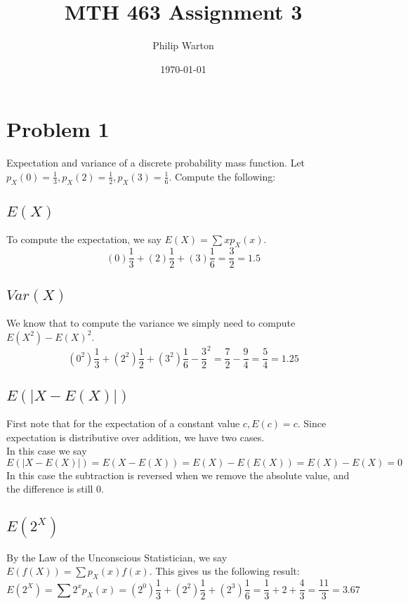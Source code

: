 \documentclass{article}
\begin{document}
\title{MTH 463 Assignment 3}
\author{Philip Warton}
\date{\today}
\maketitle
\section*{Problem 1}
    Expectation and variance of a discrete probability mass function.
    Let $p_X(0)=\frac{1}{3}, p_X(2)=\frac{1}{2}, p_X(3)=\frac{1}{6}$.
    Compute the following:
    \subsection*{$E(X)$}
        To compute the expectation, we say $E(X) = \sum xp_X(x)$.
        \[(0)\frac{1}{3}+(2)\frac{1}{2} + (3)\frac{1}{6} = \frac{3}{2}=1.5\]
    \subsection*{$Var(X)$}
        We know that to compute the variance we simply need to compute $E(X^2)-E(X)^2$.
        \[
            (0^2)\frac{1}{3}+(2^2)\frac{1}{2} + (3^2)\frac{1}{6} - \frac{3}{2}^2 = \frac{7}{2}-\frac{9}{4}=\frac{5}{4}=1.25    
        \]
    \subsection*{$E(|X-E(X)|)$}
        First note that for the expectation of a constant value $c, E(c) = c$. Since expectation is distributive over addition, we have two cases.\\
         In this case we say
        \[
            E(|X-E(X)|) = E(X-E(X)) = E(X) - E(E(X)) = E(X) - E(X) = 0
        \]
         In this case the subtraction is reversed when we remove the absolute value, and the difference is still 0.
    \subsection*{$E(2^X)$}
        By the Law of the Unconscious Statistician, we say $E(f(X)) = \sum p_X(x) f(x)$.
        This gives us the following result:
        \[
            E(2^X) = \sum 2^x p_X(x) = (2^0)\frac{1}{3} + (2^2)\frac{1}{2} + (2^3)\frac{1}{6} = \frac{1}{3} + 2 + \frac{4}{3} = \frac{11}{3} = 3.67
        \]
\end{document}
